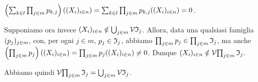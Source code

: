 $\left ( \sum_{k \in l} \prod_{j \in m} p_{k,j} \right )((X_i)_{i \in n}) =
\sum_{k \in l} \prod_{j \in m} p_{k,j}((X_i)_{i \in n}) = 0$.
\par Supponiamo ora invece $(X_i)_{i \in n} \notin \bigcup_{j \in m} \AlgebraicManifold{\PolynomialIdeal_j}$. Allora, data una qualsiasi famiglia $(p_j)_{j \in m}$, con, per ogni $j \in m$, $p_j \in \mathfrak{I}_j$, abbiamo $\prod_{j \in m} p_j \in \prod_{j \in m} \mathfrak{I}_j$, ma anche $\left ( \prod_{j \in m} p_j \right ) ((X_i)_{i \in n}) = \prod_{j \in m} p_j((X_i)_{i \in n}) \neq 0$. Dunque $(X_i)_{i \in n} \notin \AlgebraicManifold{\prod_{j \in m} \PolynomialIdeal_j}$.
\par Abbiamo quindi $\AlgebraicManifold{\prod_{j \in m} \PolynomialIdeal_j} = \bigcup_{j \in m} \AlgebraicManifold{\PolynomialIdeal_j}$. \EndProof

